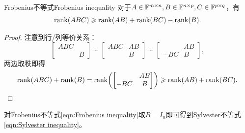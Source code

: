 \begin{theorem}{Frobenius不等式}{Frobenius inequality}
	对于$A \in \mathbb{F}^{m\times n},B \in \mathbb{F}^{n\times p},C \in \mathbb{F}^{p\times q}$，有
	\begin{equation}
		\label{eqn:Frobenius inequality}
		\operatorname{rank}(ABC) \geqslant \operatorname{rank}(AB) + \operatorname{rank}(BC) - \operatorname{rank}(B).
	\end{equation}
\end{theorem}
\begin{proof}
	注意到行/列等价关系：
	\[
		\begin{bmatrix}
			ABC\\ &B
		\end{bmatrix} \sim \begin{bmatrix}
			ABC&AB\\ &B
		\end{bmatrix} \sim \begin{bmatrix}
			&AB\\-BC&B
		\end{bmatrix},
	\]
	两边取秩即得
	\[
		\operatorname{rank}(ABC) + \operatorname{rank}(B) = \operatorname{rank}\biggl(\begin{bmatrix}
			&AB\\-BC&B
		\end{bmatrix}\biggr) \geqslant \operatorname{rank}(AB) + \operatorname{rank}(BC).
		\qedhere
	\]
\end{proof}

\begin{corollary}
	对Frobenius不等式\eqref{eqn:Frobenius inequality}取$B = I_n$即可得到Sylvester不等式\eqref{eqn:Sylvester inequality}。
\end{corollary}


